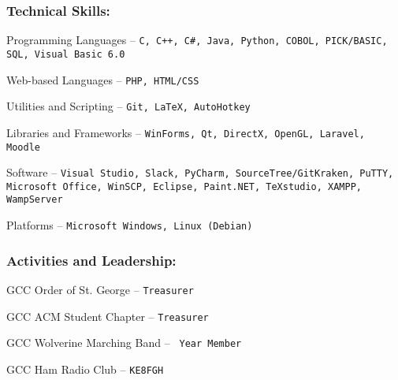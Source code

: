 \documentclass[12pt]{article}
\begin{document}
\subsubsection*{\color{head}Technical Skills:}
\begin{compactitem}
	\item {\color{accent} Programming Languages} -- \texttt{C, C++, C\#, Java, Python, COBOL, PICK/BASIC, SQL, Visual Basic 6.0}
	\item {\color{accent} Web-based Languages} -- \texttt{PHP, HTML/CSS}
	\item {\color{accent} Utilities and Scripting} -- \texttt{Git, LaTeX, AutoHotkey}
	\item {\color{accent} Libraries and Frameworks} -- \texttt{WinForms, Qt, DirectX, OpenGL, Laravel, Moodle}
	\item {\color{accent} Software} -- \texttt{Visual Studio, Slack, PyCharm, SourceTree/GitKraken, PuTTY, Microsoft Office, WinSCP, Eclipse, Paint.NET, TeXstudio, XAMPP, WampServer}
	\item {\color{accent} Platforms} -- \texttt{Microsoft Windows, Linux (Debian)}
\end{compactitem}

\subsubsection*{\color{head}Activities and Leadership:}
\begin{compactitem}
	\item {\color{accent} GCC Order of St. George} -- \texttt{Treasurer}
	\item {\color{accent} GCC ACM Student Chapter} -- \texttt{Treasurer}
	\item {\color{accent} GCC Wolverine Marching Band} -- \texttt{ Year Member}
	\item {\color{accent} GCC Ham Radio Club} -- \texttt{KE8FGH}
\end{compactitem}
\end{document}
